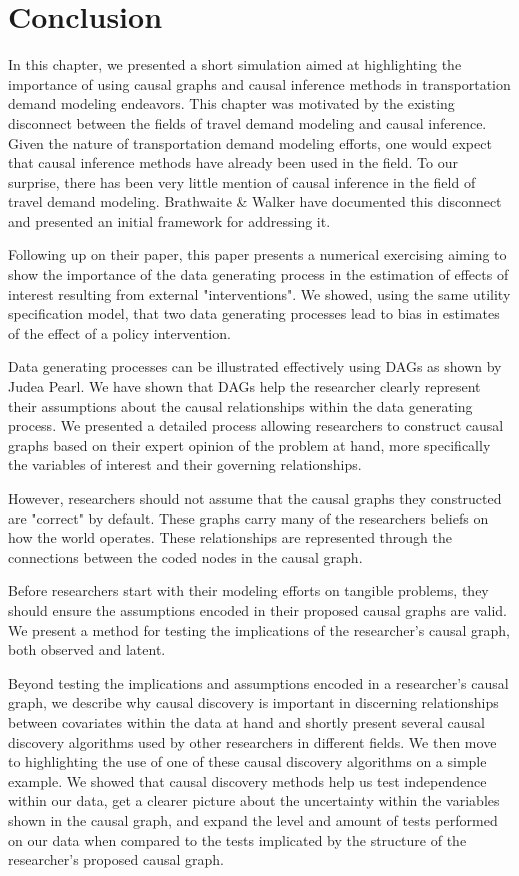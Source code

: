 \section{Conclusion}

In this chapter, we presented a short simulation aimed at highlighting the importance of using causal graphs and causal inference methods in transportation demand modeling endeavors.
This chapter was motivated by the existing disconnect between the fields of travel demand modeling
and causal inference.
Given the nature of transportation demand modeling efforts, one would expect that
causal inference methods have already been used in the field. To our surprise, there
has been very little mention of causal inference in the field of travel demand modeling.
Brathwaite & Walker \citet{brathwaite_2018_causal} have documented this disconnect and 
presented an initial framework for addressing it.

Following up on their paper, this paper presents a numerical exercising aiming to show
the importance of the data generating process in the estimation of effects of interest resulting from 
external "interventions". We showed, using the same utility specification model, that two data 
generating processes lead to bias in estimates of the effect of a policy intervention.

Data generating processes can be illustrated effectively using DAGs as shown by Judea Pearl.
We have shown that DAGs help the researcher clearly represent their assumptions about the
causal relationships within the data generating process. We presented a detailed process allowing researchers
to construct causal graphs based on their expert opinion of the problem at hand, more specifically
the variables of interest and their governing relationships. 

However, researchers should not assume that the causal graphs they constructed are "correct"
by default. These graphs carry many of the researchers beliefs on how the world operates.
These relationships are represented through the connections between the coded nodes in the causal graph.

Before researchers start with their modeling efforts on tangible problems, 
they should ensure the assumptions encoded in their proposed causal graphs are valid.
We present a method for testing the implications of the researcher's causal graph, both observed and latent.

Beyond testing the implications and assumptions encoded in a researcher's causal graph,
we describe why causal discovery is important in discerning relationships between covariates
within the data at hand and shortly present several causal discovery algorithms used by
other researchers in different fields. 
We then move to highlighting the use of one of these causal discovery algorithms on 
a simple example. We showed that causal discovery methods help us test independence within our data,
get a clearer picture about the uncertainty within the variables shown in the causal graph,
and expand the level and amount of tests performed on our data when compared to the tests
implicated by the structure of the researcher's proposed causal graph.

